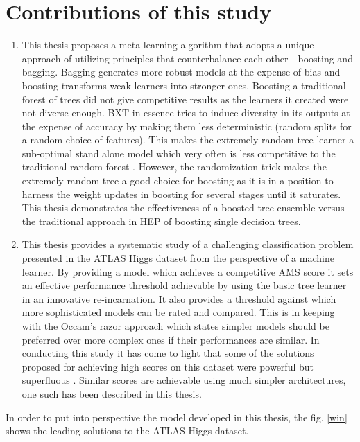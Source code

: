 
\section{Contributions of this study}

\begin{enumerate}

\item This thesis proposes a meta-learning algorithm that adopts a unique approach of utilizing principles that counterbalance each other - boosting and bagging. Bagging generates more robust models at the expense of bias and boosting transforms weak learners into stronger ones. Boosting a traditional forest of trees did not give competitive results as the learners it created were not diverse enough. BXT in essence tries to induce diversity in its outputs at the expense of accuracy by making them less deterministic (random splits for a random choice of features). This makes the extremely random tree learner a sub-optimal stand alone model which very often is less competitive to the traditional random forest \cite{xrf}. However, the randomization trick makes the extremely random tree a good choice for boosting as it is in a position to harness the weight updates in boosting for several stages until it saturates. This thesis demonstrates the effectiveness of a boosted tree ensemble versus the traditional approach in HEP of boosting single decision trees. 

\item This thesis provides a systematic study of a challenging classification problem presented in the ATLAS Higgs dataset from the perspective of a machine learner. By providing a model which achieves a competitive AMS score it sets an effective performance threshold achievable by using the basic tree learner in an innovative re-incarnation. It also provides a threshold against which more sophisticated models can be rated and compared. This is in keeping with the Occam's razor approach which states simpler models should be preferred over more complex ones if their performances are similar. In conducting this study it has come to light that some of the solutions proposed for achieving high scores on this dataset were powerful but superfluous \cite{melis}. Similar scores are achievable using much simpler architectures, one such has been described in this thesis. 

\end{enumerate}

In order to put into perspective the model developed in this thesis, the fig. \ref{win} shows the leading solutions to the ATLAS Higgs dataset. 

